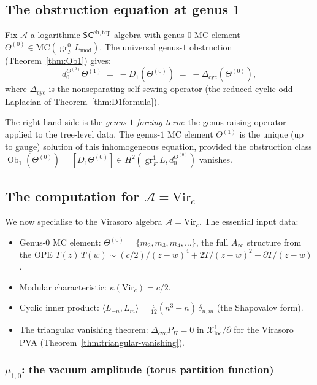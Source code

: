 \documentclass[11pt]{article}
\newcommand{\cA}{\mathcal{A}}
\newcommand{\SCchtop}{\mathsf{SC}^{\mathrm{ch,top}}}
\providecommand{\Ob}{\operatorname{Ob}}
\providecommand{\Xloc}{\mathcal{X}_{\mathrm{loc}}}
\newcommand{\MC}{\mathrm{MC}}
\DeclareMathOperator{\gr}{gr}
\begin{document}
\subsection{The obstruction equation at genus $1$}

Fix $\cA$ a logarithmic $\SCchtop$-algebra with genus-$0$ MC
element $\Theta^{(0)} \in \MC(\gr_F^0 L_{\mathrm{mod}})$.  The
universal genus-$1$ obstruction (Theorem~\ref{thm:Ob1}) gives:
\begin{equation}\label{eq:wn-genus1-obstruction}
d_0^{\Theta^{(0)}} \Theta^{(1)}
\;=\;
-D_1(\Theta^{(0)})
\;=\;
-\Delta_{\mathrm{cyc}}(\Theta^{(0)}),
\end{equation}
where $\Delta_{\mathrm{cyc}}$ is the nonseparating self-sewing
operator (the reduced cyclic odd Laplacian of
Theorem~\ref{thm:D1formula}).

The right-hand side is the \emph{genus-$1$ forcing term}: the
genus-raising operator applied to the tree-level data.  The genus-$1$
MC element $\Theta^{(1)}$ is the unique (up to gauge) solution of this
inhomogeneous equation, provided the obstruction class
$\Ob_1(\Theta^{(0)}) = [D_1\Theta^{(0)}] \in
H^2(\gr_F^1 L, d_0^{\Theta^{(0)}})$ vanishes.

\subsection{The computation for $\cA = \mathrm{Vir}_c$}

We now specialise to the Virasoro algebra $\cA = \mathrm{Vir}_c$.
The essential input data:
\begin{itemize}[leftmargin=1.8em]
\item Genus-$0$ MC element:
  $\Theta^{(0)} = \{m_2, m_3, m_4, \ldots\}$, the full $A_\infty$
  structure from the OPE $T(z)\,T(w) \sim (c/2)/(z-w)^4 + 2T/(z-w)^2
  + \partial T/(z-w)$.
\item Modular characteristic: $\kappa(\mathrm{Vir}_c) = c/2$.
\item Cyclic inner product: $\langle L_{-n}, L_m \rangle =
  \frac{c}{12}(n^3 - n)\,\delta_{n,m}$ (the Shapovalov form).
\item The triangular vanishing theorem: $\Delta_{\mathrm{cyc}} P_\Pi = 0$
  in $\Xloc^1/\partial$ for the Virasoro PVA
  (Theorem~\ref{thm:triangular-vanishing}).
\end{itemize}

\subsubsection{$\mu_{1,0}$: the vacuum amplitude (torus partition function)}
\end{document}

